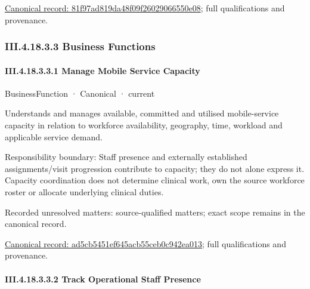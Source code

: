 {\footnotesize \href{../../../../../../../continuum/business/business-function/81f97ad819da48f09f26029066550e08.md}{Canonical record: 81f97ad819da48f09f26029066550e08}; full qualifications and provenance.}\par
\subsubsection*{III.4.18.3.3 Business Functions}
\label{navigation:III.4.18.3.3}

\paragraph*{III.4.18.3.3.1 Manage Mobile Service Capacity}
\label{navigation:III.4.18.3.3.1}

\label{element:ad5cb5451ef645acb55ceb0c942ea013}
{\small BusinessFunction · Canonical · current}\par

Understands and manages available, committed and utilised mobile-service capacity in relation to workforce availability, geography, time, workload and applicable service demand.



Responsibility boundary: Staff presence and externally established assignments/visit progression contribute to capacity; they do not alone express it. Capacity coordination does not determine clinical work, own the source workforce roster or allocate underlying clinical duties.


{\small Recorded unresolved matters: source-qualified matters; exact scope remains in the canonical record.}\par
{\footnotesize \href{../../../../../../../continuum/business/business-function/ad5cb5451ef645acb55ceb0c942ea013.md}{Canonical record: ad5cb5451ef645acb55ceb0c942ea013}; full qualifications and provenance.}\par
\paragraph*{III.4.18.3.3.2 Track Operational Staff Presence}
\label{navigation:III.4.18.3.3.2}


